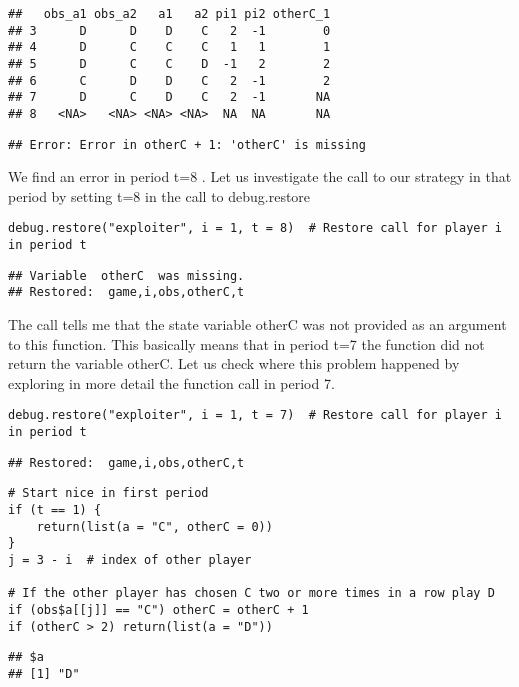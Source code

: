 \documentclass[]{article}
\begin{document}
\begin{verbatim}
##   obs_a1 obs_a2   a1   a2 pi1 pi2 otherC_1
## 3      D      D    D    C   2  -1        0
## 4      D      C    C    C   1   1        1
## 5      D      C    C    D  -1   2        2
## 6      C      D    D    C   2  -1        2
## 7      D      C    D    C   2  -1       NA
## 8   <NA>   <NA> <NA> <NA>  NA  NA       NA
\end{verbatim}

\begin{verbatim}
## Error: Error in otherC + 1: 'otherC' is missing
\end{verbatim}

We find an error in period t=8 . Let us investigate the call to our
strategy in that period by setting t=8 in the call to debug.restore

\begin{verbatim}
debug.restore("exploiter", i = 1, t = 8)  # Restore call for player i in period t
\end{verbatim}

\begin{verbatim}
## Variable  otherC  was missing.
## Restored:  game,i,obs,otherC,t
\end{verbatim}

The call tells me that the state variable otherC was not provided as an
argument to this function. This basically means that in period t=7 the
function did not return the variable otherC. Let us check where this
problem happened by exploring in more detail the function call in period
7.

\begin{verbatim}
debug.restore("exploiter", i = 1, t = 7)  # Restore call for player i in period t
\end{verbatim}

\begin{verbatim}
## Restored:  game,i,obs,otherC,t
\end{verbatim}

\begin{verbatim}
# Start nice in first period
if (t == 1) {
    return(list(a = "C", otherC = 0))
}
j = 3 - i  # index of other player

# If the other player has chosen C two or more times in a row play D
if (obs$a[[j]] == "C") otherC = otherC + 1
if (otherC > 2) return(list(a = "D"))
\end{verbatim}

\begin{verbatim}
## $a
## [1] "D"
\end{verbatim}
\end{document}
